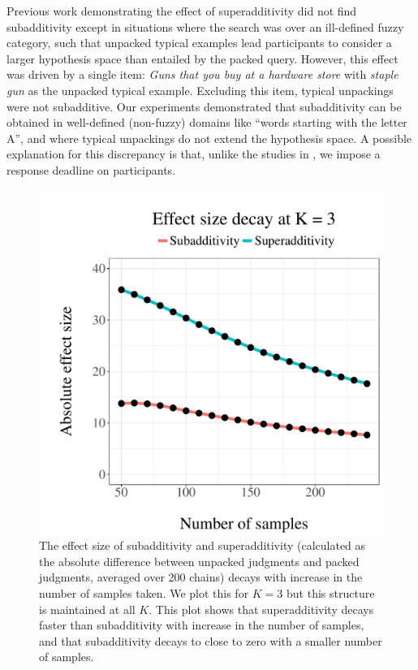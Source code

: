 Previous work demonstrating the effect of superadditivity \citep{super} did not find subadditivity except in situations where the search was over an ill-defined fuzzy category, such that unpacked typical examples lead participants to consider a larger hypothesis space than entailed by the packed query. However, this effect was driven by a single item: \textit{Guns that you buy at a hardware store} with \textit{staple gun} as the unpacked typical example. Excluding this item, typical unpackings were not subadditive. Our experiments demonstrated that subadditivity can be obtained in well-defined (non-fuzzy) domains like ``words starting with the letter A'', and where typical unpackings do not extend the hypothesis space. A possible explanation for this discrepancy is that, unlike the studies in \citet{super}, we impose a response deadline on participants. 
\begin{figure}
\centering
\includegraphics[scale = 0.5]{figures/compare3.pdf}
\caption{The effect size of subadditivity and superadditivity (calculated as the absolute difference between unpacked judgments and packed judgments, averaged over 200 chains) decays with increase in the number of samples taken. We plot this for $K = 3$ but this structure is maintained at all $K$. This plot shows that superadditivity decays faster than subadditivity with increase in the number of samples, and that subadditivity decays to close to zero with a smaller number of samples.}
\label{fig:decay}
\end{figure}
